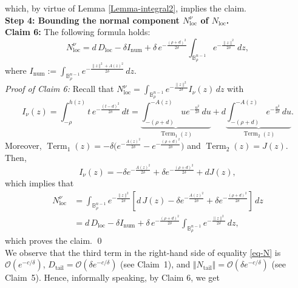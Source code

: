 \documentclass[11pt]{amsart}
\newcommand{\1}{\mathds{1}}
\theoremstyle{definition}
\theoremstyle{remark}
\theoremstyle{definition}
\begin{document}
which, by virtue of Lemma \ref{Lemma-integral2}, implies the claim.\\
\noindent\textbf{Step 4: Bounding the normal component $N_{\operatorname{loc}}^{\nu}$ of $N_{\operatorname{loc}}$.}\\
\textbf{Claim 6:}  The following formula holds:
\begin{equation}\label{eq-N}
N_{\operatorname{loc}}^{\nu}
= d\,D_{\operatorname{loc}}
-\delta I_{\operatorname{num}}
+\delta\, e^{-\frac{(\rho+d)^2}{2\delta}}\int_{\mathbb{B}_{\rho}^{n-1}} e^{-\frac{\|z\|^2}{2\delta}}\,dz,
\end{equation}
where $I_{\operatorname{num}}:=\int_{\mathbb{B}_{\rho}^{n-1}} e^{-\frac{\|z\|^2 + A(z)^2}{2\delta}}\,dz$.\\
\emph{Proof of Claim 6:} Recall that $N_{\operatorname{loc}}^{\nu}=\int_{\mathbb{B}_{\rho}^{n-1}} e^{-\frac{\|z\|^2}{2\delta}} I_{\nu}(z)\,dz$ with 
\begin{equation*}
    I_{\nu}(z)=\int_{-\rho}^{h(z)} t\, e^{-\frac{(t-d)^2}{2\delta}}\,dt=\underbrace{\int_{-(\rho+d)}^{-A(z)}u e^{-\frac{u^2}{2\delta}}\,du}_{\operatorname{Term}_1(z)}+d\underbrace{\int_{-(\rho+d)}^{-A(z)} e^{-\frac{u^2}{2\delta}}\,du}_{\operatorname{Term}_2(z)}.
\end{equation*}
Moreover, $\operatorname{Term}_1(z)=-\delta \big(e^{-\frac{A(z)^2}{2\delta}}-e^{-\frac{(\rho+d)^2}{2\delta}}\big)$ and $\operatorname{Term}_2(z)=J(z)$. Then, 
$$
 I_{\nu}(z)=-\delta e^{-\frac{A(z)^2}{2\delta}}+\delta e^{-\frac{(\rho+d)^2}{2\delta}}+dJ(z),
$$
which implies that
\begin{equation*}
    \begin{aligned}
N_{\operatorname{loc}}^{\nu}
&=\int_{\mathbb{B}_{\rho}^{n-1}} e^{-\frac{\|z\|^2}{2\delta}}
\left[d\,J(z)-\delta e^{-\frac{A(z)^2}{2\delta}}+\delta e^{-\frac{(\rho+d)^2}{2\delta}}\right]\,dz\\
 &=d\,D_{\operatorname{loc}}-\delta  I_{\operatorname{num}}+\delta\,e^{-\frac{(\rho+d)^2}{2\delta}}\int_{\mathbb{B}_{\rho}^{n-1}} e^{-\frac{\|z\|^2}{2\delta}}\,dz,
    \end{aligned}
\end{equation*}
which proves the claim. \qed\\
We observe that the third term in the right-hand side of equality \eqref{eq-N} is $\mathcal{O}(e^{-c/\delta})$,  $D_{\operatorname{tail}}=\mathcal{O}(\delta e^{-c/\delta})$ (see Claim~1), and $\Vert N_{\operatorname{tail}}\Vert=\mathcal{O}(\delta e^{-c/\delta})$ (see Claim~5). Hence, informally speaking, by  Claim 6, we get
\end{document}
